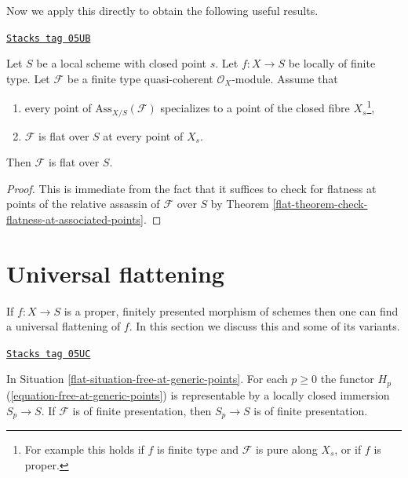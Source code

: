 Now we apply this directly to obtain the following useful results.

\begin{lemma}
\label{flat-lemma-check-along-closed-fibre}
\href{https://stacks.math.columbia.edu/tag/05UB}{\texttt{Stacks tag 05UB}}

Let $S$ be a local scheme with closed point $s$.
Let $f : X \to S$ be locally of finite type.
Let $\mathcal{F}$ be a finite type quasi-coherent $\mathcal{O}_X$-module.
Assume that
\begin{enumerate}
\item every point of $\text{Ass}_{X/S}(\mathcal{F})$ specializes
to a point of the closed fibre $X_s$\footnote{For example this holds if
$f$ is finite type and $\mathcal{F}$ is pure along $X_s$, or
if $f$ is proper.},
\item $\mathcal{F}$ is flat over $S$ at every point of $X_s$.
\end{enumerate}
Then $\mathcal{F}$ is flat over $S$.
\end{lemma}

\begin{proof}

This is immediate from the fact that it suffices to check for
flatness at points of the relative assassin of $\mathcal{F}$
over $S$ by
Theorem \ref{flat-theorem-check-flatness-at-associated-points}.
\end{proof}

\section{Universal flattening}
\label{flat-section-flattening-final}
If $f : X \to S$ is a proper, finitely presented morphism
of schemes then one can find a universal flattening of $f$.
In this section we discuss this and some of its variants.

\begin{lemma}
\label{flat-lemma-free-at-generic-points-representable}
\href{https://stacks.math.columbia.edu/tag/05UC}{\texttt{Stacks tag 05UC}}

In Situation \ref{flat-situation-free-at-generic-points}.
For each $p \geq 0$ the functor $H_p$
(\ref{equation-free-at-generic-points}) is representable
by a locally closed immersion $S_p \to S$. If $\mathcal{F}$
is of finite presentation, then $S_p \to S$ is of finite presentation.
\end{lemma}

